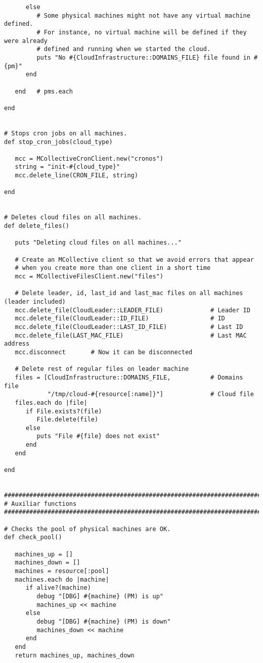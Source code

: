 \begin{lstlisting}
      else
         # Some physical machines might not have any virtual machine defined.
         # For instance, no virtual machine will be defined if they were already
         # defined and running when we started the cloud.
         puts "No #{CloudInfrastructure::DOMAINS_FILE} file found in #{pm}"
      end
      
   end   # pms.each

end


# Stops cron jobs on all machines.
def stop_cron_jobs(cloud_type)

   mcc = MCollectiveCronClient.new("cronos")
   string = "init-#{cloud_type}"
   mcc.delete_line(CRON_FILE, string)

end


# Deletes cloud files on all machines.
def delete_files()

   puts "Deleting cloud files on all machines..."
   
   # Create an MCollective client so that we avoid errors that appear
   # when you create more than one client in a short time
   mcc = MCollectiveFilesClient.new("files")
   
   # Delete leader, id, last_id and last_mac files on all machines (leader included)
   mcc.delete_file(CloudLeader::LEADER_FILE)             # Leader ID
   mcc.delete_file(CloudLeader::ID_FILE)                 # ID
   mcc.delete_file(CloudLeader::LAST_ID_FILE)            # Last ID
   mcc.delete_file(LAST_MAC_FILE)                        # Last MAC address
   mcc.disconnect       # Now it can be disconnected
   
   # Delete rest of regular files on leader machine
   files = [CloudInfrastructure::DOMAINS_FILE,           # Domains file
            "/tmp/cloud-#{resource[:name]}"]             # Cloud file
   files.each do |file|
      if File.exists?(file)
         File.delete(file)
      else
         puts "File #{file} does not exist"
      end
   end

end


################################################################################
# Auxiliar functions
################################################################################

# Checks the pool of physical machines are OK.
def check_pool()

   machines_up = []
   machines_down = []
   machines = resource[:pool]
   machines.each do |machine|
      if alive?(machine)
         debug "[DBG] #{machine} (PM) is up"
         machines_up << machine
      else
         debug "[DBG] #{machine} (PM) is down"
         machines_down << machine
      end
   end
   return machines_up, machines_down
   

\end{lstlisting}
